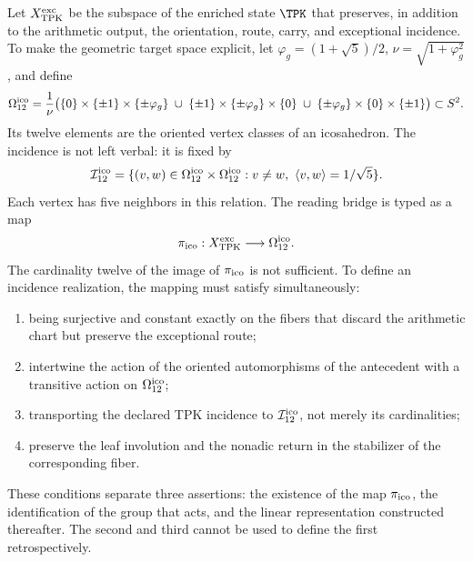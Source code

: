Let \(X_{\rm TPK}^{\rm exc}\) be the subspace of the enriched state \(\TPK\)
that preserves, in addition to the arithmetic output, the orientation, route,
carry, and exceptional incidence. To make the geometric target space explicit,
let \(\varphi_g=(1+\sqrt5)/2\), \(\nu=\sqrt{1+\varphi_g^2}\), and define
\begin{equation}
\label{rm:eq:gravity-icosahedron-vertices}
\Omega_{12}^{\rm ico}
=\frac1\nu\bigl(
\{0\}\times\{\pm1\}\times\{\pm\varphi_g\}
\;\cup\;
\{\pm1\}\times\{\pm\varphi_g\}\times\{0\}
\;\cup\;
\{\pm\varphi_g\}\times\{0\}\times\{\pm1\}
\bigr)\subset S^2.
\end{equation}
Its twelve elements are the oriented vertex classes of an icosahedron.
The incidence is not left verbal: it is fixed by
\begin{equation}
\label{rm:eq:gravity-icosahedron-incidence}
\mathcal I_{12}^{\rm ico}
=\{(v,w)\in\Omega_{12}^{\rm ico}\times\Omega_{12}^{\rm ico}:
v\neq w,\ \langle v,w\rangle=1/\sqrt5\}.
\end{equation}
Each vertex has five neighbors in this relation. The reading bridge
is typed as a map
\begin{equation}
\label{rm:eq:gravity-exceptional-reader-map}
\pi_{\rm ico}:X_{\rm TPK}^{\rm exc}\longrightarrow\Omega_{12}^{\rm ico}.
\end{equation}
The cardinality twelve of the image of \(\pi_{\rm ico}\) is not sufficient.
To define an incidence realization, the mapping must satisfy
simultaneously:
\begin{enumerate}[label=(\roman*)]
\item being surjective and constant exactly on the fibers that
discard the arithmetic chart but preserve the exceptional route;
\item intertwine the action of the oriented automorphisms of the antecedent
with a transitive action on \(\Omega_{12}^{\rm ico}\);
\item transporting the declared TPK incidence to
\(\mathcal I_{12}^{\rm ico}\), not
merely its cardinalities;
\item preserve the leaf involution and the nonadic return in the
stabilizer of the corresponding fiber.
\end{enumerate}

These conditions separate three assertions: the existence of the map
\(\pi_{\rm ico}\), the identification of the group that acts, and the
linear representation constructed thereafter. The second and third
cannot be used to define the first retrospectively.


